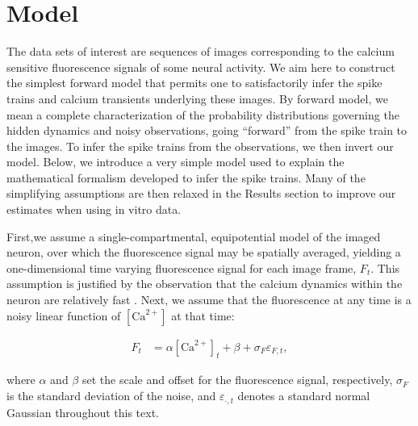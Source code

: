 \documentclass[10pt]{article}
\newcommand{\Ca}{[\text{Ca}^{2+}]}
\begin{document}
\section*{Model} \label{sec:model}

The data sets of interest are sequences of images corresponding to the calcium sensitive fluorescence signals of some neural activity. We aim here to construct the simplest forward model that permits one to satisfactorily infer the spike trains and calcium transients underlying these images. By forward model, we mean a complete characterization of the probability distributions governing the hidden dynamics and noisy observations, going ``forward'' from the spike train to the images. To infer the spike trains from the observations, we then invert our model. Below, we introduce a very simple model used to explain the mathematical formalism developed to infer the spike trains. Many of the simplifying assumptions are then relaxed in the Results section to improve our estimates when using in vitro data.  %

First,we assume a single-compartmental, equipotential model of the imaged neuron, over which the fluorescence signal may be spatially averaged, yielding a one-dimensional time varying fluorescence signal for each image frame, $F_t$.  This assumption is justified by the observation that the calcium dynamics within the neuron are relatively fast \cite{SabatiniRegehr98, MajewskaYuste00}. Next, we assume that the fluorescence at any time is a noisy linear function of $\Ca$ at that time:

\begin{align} \label{eq:F_t}
F_t &= \alpha \Ca_t + \beta + \sigma_F \varepsilon_{F,t},%
\end{align}

\noindent where $\alpha$ and $\beta$ set the scale and offset for the fluorescence signal, respectively, $\sigma_F$ is the standard deviation of the noise, and  $\varepsilon_{\cdot,t}$ denotes a standard normal Gaussian throughout this text. %
\end{document}
